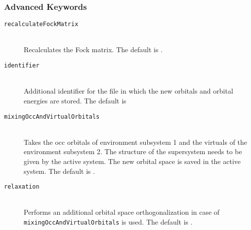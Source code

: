 \subsubsection{Advanced Keywords}
\begin{description}
  \item[\texttt{recalculateFockMatrix}]\hfill\\
  Recalculates the Fock matrix. The default is .
  \item[\texttt{identifier}]\hfill\\
  Additional identifier for the file in which the new orbitals and orbital energies are stored. The default is 
  \item[\texttt{mixingOccAndVirtualOrbitals}]\hfill\\
  Takes the occ orbitals of environment subsystem 1 and the virtuals of the environment subsystem 2. The structure of the supersystem needs to be given by the active system. The new orbital space is saved in the active system. The default is .
  \item[\texttt{relaxation}]\hfill\\
  Performs an additional orbital space orthogonalization in case of \texttt{mixingOccAndVirtualOrbitals} is used. The default is .
\end{description}
